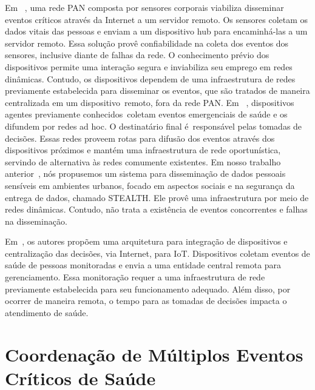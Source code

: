 \documentclass[12pt]{article}
\begin{document}
Em ~\cite{blount2007remote}, uma rede PAN composta por sensores corporais viabiliza disseminar eventos críticos através da Internet a um servidor remoto. Os sensores coletam os dados vitais das pessoas e enviam a um dispositivo hub para encaminhá-las a um servidor remoto. Essa solução provê confiabilidade na coleta dos eventos dos sensores, inclusive diante de falhas da rede. O conhecimento prévio dos dispositivos permite uma interação segura e inviabiliza seu emprego em redes dinâmicas. Contudo, os dispositivos dependem de uma infraestrutura de redes previamente estabelecida para disseminar os eventos, que são tratados de maneira centralizada em um dispositivo~remoto, fora da rede PAN. 
%
Em ~\cite{nittel2012localalert}, dispositivos agentes previamente conhecidos~coletam eventos emergenciais de saúde e os difundem por redes ad hoc. O destinatário final é~responsável pelas tomadas de decisões. Essas redes
proveem rotas para difusão dos eventos através dos dispositivos próximos e mantém uma infraestrutura de rede oportunística, servindo de alternativa às redes 
comumente 
existentes.
Em nosso trabalho anterior~\cite{batista2019sbseg}, nós
propusemos
um sistema para disseminação de dados pessoais sensíveis 
em ambientes urbanos, focado em aspectos sociais e na segurança da entrega de dados, chamado \mbox{STEALTH}. Ele provê uma infraestrutura por meio de redes dinâmicas.  
Contudo,
não trata a existência de eventos  
concorrentes e falhas na disseminação. 

Em~\cite{dar2015resource}, os autores propõem uma arquitetura para integração de dispositivos e centralização das decisões, via Internet, para IoT. Dispositivos coletam eventos de saúde de pessoas monitoradas e envia a uma entidade central remota para gerenciamento. Essa monitoração requer a uma infraestrutura de rede previamente estabelecida para seu funcionamento adequado. Além disso, por ocorrer de maneira remota, o tempo para as tomadas de decisões impacta o atendimento de saúde.


\section{Coordenação de Múltiplos Eventos Críticos de Saúde}
\label{sec:sistema}
\end{document}
